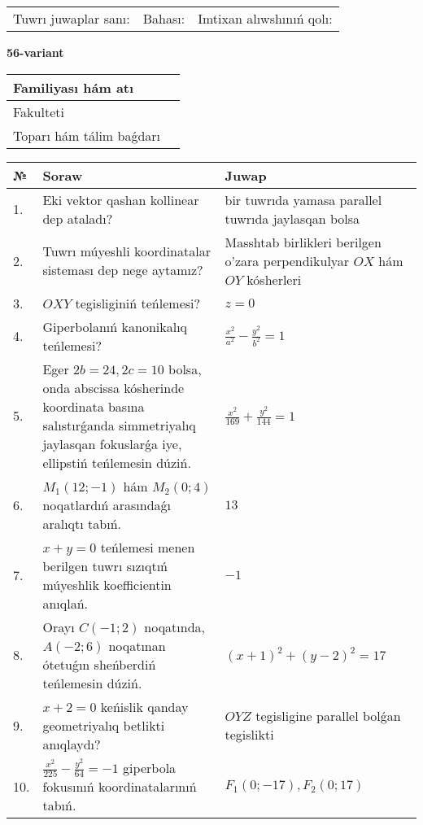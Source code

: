 \documentclass{article}
\begin{document}
\vspace{1cm}

\begin{tabular}{lll}
Tuwrı juwaplar sanı: \underline{\hspace{1.5cm}} & 
Bahası: \underline{\hspace{1.5cm}} & 
Imtixan alıwshınıń qolı: \underline{\hspace{2cm}} \\
\end{tabular}

\egroup

\newpage


\textbf{56-variant}\\

\bgroup
\def\arraystretch{1.6} %

\begin{tabular}{|m{5.7cm}|m{9.5cm}|}
\hline
Familiyası hám atı & \\
\hline
Fakulteti  & \\
\hline
Toparı hám tálim baǵdarı  & \\
\hline
\end{tabular}

\vspace{1cm}

\begin{tabular}{|m{0.7cm}|m{10cm}|m{4cm}|}
\hline
№ & Soraw & Juwap \\
\hline
1. & Eki vektor qashan kollinear dep ataladı? & bir tuwrıda yamasa parallel tuwrıda jaylasqan bolsa \\
\hline
2. & Tuwrı múyeshli koordinatalar sisteması dep nege aytamız? & Masshtab birlikleri berilgen o'zara perpendikulyar $OX$ hám $OY$ kósherleri \\
\hline
3. & $OXY$ tegisliginiń teńlemesi? & $z=0$ \\
\hline
4. & Giperbolanıń kanonikalıq teńlemesi? & $\frac{x^2}{a^2}-\frac{y^2}{b^2}=1$ \\
\hline
5. & Eger $2b=24, 2 c=10$ bolsa, onda abscissa kósherinde koordinata basına salıstırǵanda simmetriyalıq jaylasqan fokuslarǵa iye, ellipstiń teńlemesin dúziń. & $\frac{x^{2}}{169}+\frac{y^{2}}{144}=1$ \\
\hline
6. & $M_{1} (12;-1)$ hám $M_{2} (0;4)$ noqatlardıń arasındaǵı aralıqtı tabıń. & $13$ \\
\hline
7. & $x+y=0$ teńlemesi menen berilgen tuwrı sızıqtıń múyeshlik koefficientin anıqlań. & $- 1$ \\
\hline
8. & Orayı $C (-1;2)$ noqatında, $A (-2;6 )$ noqatınan ótetuǵın sheńberdiń teńlemesin dúziń. & $(x+1)^{2}+(y-2)^{2}=17$ \\
\hline
9. & $x+2=0$ keńislik qanday geometriyalıq betlikti anıqlaydı? &  $OYZ$ tegisligine parallel bolǵan tegislikti \\
\hline
10. & $\frac{x^{2}}{225}-\frac{y^{2}}{64}=-1$ giperbola fokusınıń koordinatalarınıń tabıń. & $F_{1}(0;-17), F_{2}(0;17)$ \\
\hline
\end{tabular}
\end{document}
